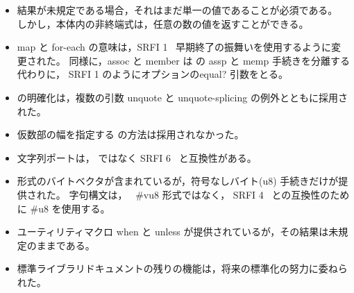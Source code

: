 \begin{itemize}
\item 結果が未規定である場合，それはまだ単一の値であることが必須である。
しかし，本体内の非終端式は，任意の数の値を返すことができる。

\item {\cf map} と {\cf for-each} の意味は，SRFI 1~\cite{srfi1} 早期終了の振舞いを使用するように変更された。
同様に，{\cf assoc} と {\cf member} は \rsixrs の {\cf assp} と {\cf memp} 手続きを分離する代わりに，
SRFI 1 のようにオプションの{\cf equal?} 引数をとる。

\item {} の明確化は，複数の引数 {\cf unquote} と {\cf unquote-splicing} の例外とともに採用された。

\item 仮数部の幅を指定する \rsixrs の方法は採用されなかった。

\item 文字列ポートは， \rsixrs ではなく SRFI 6~\cite{srfi6} と互換性がある。

\item \rsixrs 形式のバイトベクタが含まれているが，符号なしバイト({\cf u8}) 手続きだけが提供された。
字句構文は， \rsixrs~{\cf \#vu8} 形式ではなく， SRFI 4~\cite{srfi4} との互換性のために {\cf \#u8} を使用する。

\item ユーティリティマクロ {\cf when} と {\cf unless} が提供されているが，その結果は未規定のままである。

\item 標準ライブラリドキュメントの残りの機能は，将来の標準化の努力に委ねられた。

\end{itemize}


